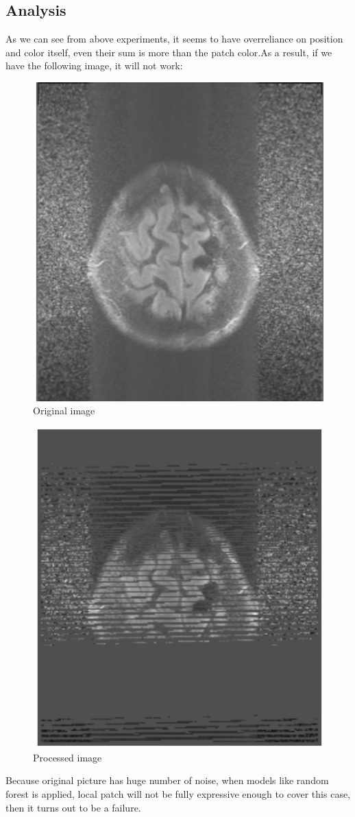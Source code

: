 \documentclass[conference]{IEEEtran}
\begin{document}
\subsection{Analysis}
As we can see from above experiments, it seems to have overreliance on position and color itself, even their sum is more than the patch color.As a result, if we have the following image, it will not work:
\begin{figure}[h!]
\caption{Original image}
\includegraphics[scale = 0.34]{Snipaste_2018-05-28_14-39-56.png} 
\centering 
\end{figure}
\begin{figure}[h!]
\centering 
\caption{Processed image}
\includegraphics[scale = 0.34]{Snipaste_2018-05-28_14-40-00.png}
\end{figure}
Because original picture has huge number of noise, when models like random forest is applied, local patch will not be fully expressive enough to cover this case, then it turns out to be a failure.
\end{document}
